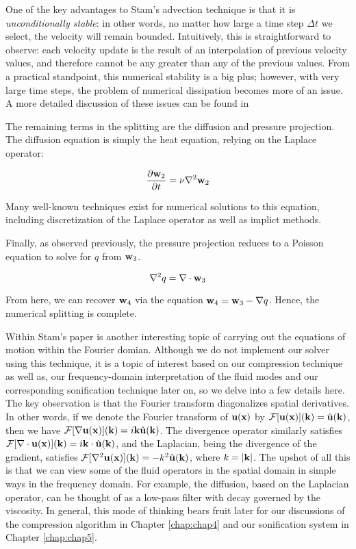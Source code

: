 One of the key advantages to Stam's advection technique is that it is {\em unconditionally stable}: in other words, no matter how large a time step $\Delta t$ we select, the velocity will remain bounded. Intuitively, this is straightforward to observe: each velocity update is the result of an interpolation of previous velocity values, and therefore cannot be any greater than any of the previous values. From a practical standpoint, this numerical stability is a big plus; however, with very large time steps, the problem of numerical dissipation becomes more of an issue. A more detailed discussion of these issues can be found in 

The remaining terms in the splitting are the diffusion and pressure projection. The diffusion equation is simply the heat equation, relying on the Laplace operator:

\begin{equation}
\frac{\partial{\mathbf{w}_2}}{\partial{t}} = \nu \nabla^2 \mathbf{w}_2
\end{equation}

Many well-known techniques exist for numerical solutions to this equation, including discretization of the Laplace operator as well as implict methods. 

Finally, as observed previously, the pressure projection reduces to a Poisson equation to solve for $q$ from $\mathbf{w}_3$.

\begin{equation}
\nabla^2 q = \nabla \cdot \mathbf{w}_3
\end{equation}

From here, we can recover $\mathbf{w}_4$ via the equation $\mathbf{w}_4 = \mathbf{w}_3 - \nabla q$. Hence, the numerical splitting is complete.

Within Stam's paper is another interesting topic of carrying out the equations of motion within the Fourier domian. Although 
we do not implement our solver using this technique, it is a topic of interest based on our compression technique as well as,
our frequency-domain interpretation of the fluid modes and our corresponding sonification technique later on, so we delve into a few details here. The key observation is that the Fourier transform diagonalizes spatial derivatives. In other words, if we denote the Fourier transform of $\mathbf{u}(\mathbf{x})$ by $\mathcal{F}[\mathbf{u}(\mathbf{x})](\mathbf{k}) = \hat{\mathbf{u}}(\mathbf{k})$, then we have $\mathcal{F}[\nabla \mathbf{u}(\mathbf{x})](\mathbf{k}) = i \mathbf{k} \hat{\mathbf{u}}(\mathbf{k})$. The divergence operator similarly satisfies $\mathcal{F}[\nabla \cdot \mathbf{u}(\mathbf{x})](\mathbf{k}) = i \mathbf{k} \cdot \hat{\mathbf{u}}(\mathbf{k})$, and the Laplacian, being the divergence of the gradient, satisfies $\mathcal{F}[\nabla^2 \mathbf{u}(\mathbf{x})](\mathbf{k}) = - k^2 \hat{\mathbf{u}}(\mathbf{k})$, where $k = |\mathbf{k}|$. The upshot of all this is that we can view some of the fluid operators in the spatial domain in simple ways in the frequency domain. For example, the diffusion, based on the Laplacian operator, can be thought of as a low-pass filter with decay governed by the viscosity. In general, this mode of
thinking bears fruit later for our discussions of the compression algorithm in Chapter \ref{chap:chap4} and our sonification system in Chapter \ref{chap:chap5}.

